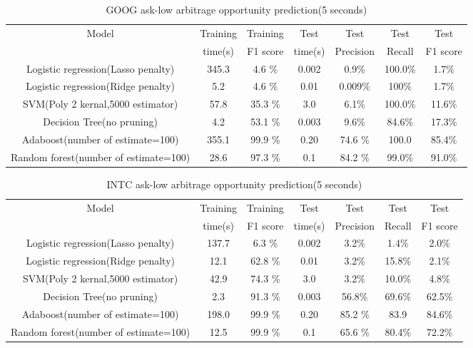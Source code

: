 \begin{table}[htp!]
	\caption{GOOG ask-low arbitrage opportunity prediction(5 seconds)}
	\label{ask_low_prediction}
	\begin{center}
		\begin{tabular}{|c|c|c|c|c|c|c|}
			\hline
			 Model& Training & Training  & Test  & Test & Test & Test \\[5pt]
			 & time(s) & F1 score & time(s) & Precision & Recall & F1 score \\[5pt]
			 \hline
			 Logistic regression(Lasso penalty)& 345.3 & 4.6 \% & 0.002 & 0.9\% & 100.0\%& 1.7\%\\[5pt]
			 Logistic regression(Ridge penalty)& 5.2 & 4.6 \% & 0.01 &  0.009\% & 100\%& 1.7\%\\[5pt]
			 SVM(Poly 2 kernal,5000 estimator)& 57.8 & 35.3 \% & 3.0 &  6.1\% & 100.0\%& 11.6\%\\[5pt]
			 Decision Tree(no pruning)& 4.2 & 53.1 \% & 0.003 &  9.6\% & 84.6\%& 17.3\%\\[5pt]
			 Adaboost(number of estimate=100)& 355.1 & 99.9 \% & 0.20 & 74.6 \% & 100.0 &  85.4\% \\[5pt]
			 Random forest(number of estimate=100)& 28.6 & 97.3 \% & 0.1 & 84.2 \% & 99.0\% &  91.0\% \\[5pt]		 	
	 		\hline 
		\end{tabular}
	\end{center}
\end{table}

\begin{table}[htp!]
	\caption{INTC ask-low arbitrage opportunity prediction(5 seconds)}
	\label{ask_low_prediction}
	\begin{center}
		\begin{tabular}{|c|c|c|c|c|c|c|}
			\hline
			 Model& Training & Training  & Test  & Test & Test & Test \\[5pt]
			 & time(s) & F1 score & time(s) & Precision & Recall & F1 score \\[5pt]
			 \hline
			 Logistic regression(Lasso penalty)& 137.7 & 6.3 \% & 0.002 & 3.2\% & 1.4\%& 2.0\%\\[5pt]
			 Logistic regression(Ridge penalty)& 12.1 & 62.8 \% & 0.01 &  3.2\% & 15.8\%& 2.1\%\\[5pt]
			 SVM(Poly 2 kernal,5000 estimator)& 42.9 & 74.3 \% & 3.0 &  3.2\% & 10.0\%& 4.8\%\\[5pt]
			 Decision Tree(no pruning)& 2.3 & 91.3 \% & 0.003 &  56.8\% & 69.6\%& 62.5\%\\[5pt]
			 Adaboost(number of estimate=100)& 198.0 & 99.9 \% & 0.20 & 85.2 \% & 83.9 &  84.6\% \\[5pt]
			 Random forest(number of estimate=100)& 12.5 & 99.9 \% & 0.1 & 65.6 \% & 80.4\% &  72.2\% \\[5pt]		 	
	 		\hline 
		\end{tabular}
	\end{center}
\end{table}

